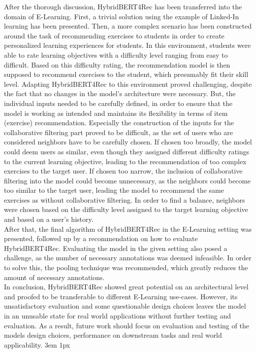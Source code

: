 \documentclass{Academic}
\begin{document}
    After the thorough discussion, HybridBERT4Rec has been transferred into the domain of E-Learning. First, a trivial solution using the example of Linked-In learning has been presented. Then, a more complex scenario has been constructed around the task of recommending exercises to students in order to create personalized learning experiences for students. In this environment, students were able to rate learning objectives with a difficulty level ranging from easy to difficult. Based on this difficulty rating, the recommendation model is then supposed to recommend exercises to the student, which presumably fit their skill level. Adapting HybridBERT4Rec to this environment proved challenging, despite the fact that no changes in the model's architecture were necessary. But, the individual inputs needed to be carefully defined, in order to ensure that the model is working as intended and maintains its flexibility in terms of item (exercise) recommendation. Especially the construction of the inputs for the collaborative filtering part proved to be difficult, as the set of users who are considered neighbors have to be carefully chosen. If chosen too broadly, the model could deem users as similar, even though they assigned different difficulty ratings to the current learning objective, leading to the recommendation of too complex exercises to the target user. If chosen too narrow, the inclusion of collaborative filtering into the model could become unnecessary, as the neighbors could become too similar to the target user, leading the model to recommend the same exercises as without collaborative filtering. In order to find a balance, neighbors were chosen based on the difficulty level assigned to the target learning objective and based on a user's history.\\
    After that, the final algorithm of HybridBERT4Rec in the E-Learning setting was presented, followed up by a recommendation on how to evaluate HybridBERT4Rec. Evaluating the model in the given setting also posed a challenge, as the number of necessary annotations was deemed infeasible. In order to solve this, the pooling technique was recommended, which greatly reduces the amount of necessary annotations.\\
    In conclusion, HybridBERT4Rec showed great potential on an architectural level and proofed to be transferable to different E-Learning use-cases. However, its unsatisfactory evaluation and some questionable design choices leaves the model in an unusable state for real world applications without further testing and evaluation. As a result, future work should focus on evaluation and testing of the models design choices, performance on downstream tasks and real world applicability.
    \singlespacing
    \emergencystretch 3em
    \hfuzz 1px
    \printbibliography[heading=bibnumbered]




\end{document}
